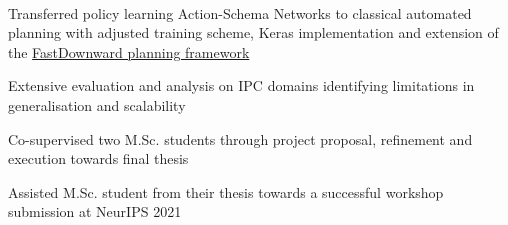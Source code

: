 \documentclass[]{lukas-cv-openfont}
\begin{document}

\noindent
{}
\\
\begin{tightitemize}{1.7em}
    \item Transferred policy learning Action-Schema Networks to classical automated planning with adjusted training scheme, Keras implementation and extension of the \href{http://www.fast-downward.org}{FastDownward planning framework}
    \item Extensive evaluation and analysis on IPC domains identifying limitations in generalisation and scalability
\end{tightitemize}
\largesectionsep


\noindent
{}
\begin{tightitemize}{1.7em}
    \item Co-supervised two M.Sc. students through project proposal, refinement and execution towards final thesis
    \item Assisted M.Sc. student from their thesis towards a successful workshop submission at NeurIPS 2021
\end{tightitemize}
\largesectionsep


\end{document}
